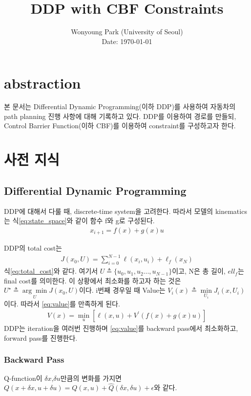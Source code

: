 \documentclass[journal]{IEEEtran}
\begin{document}
\title{DDP with CBF Constraints}

\author{Wonyoung Park (University of Seoul)\\ 
        Date: \today
        }

\maketitle

\section{abstraction}
본 문서는 Differential Dynamic Programming(이하 DDP)를 사용하여 자동차의 path planning 진행 사항에 대해 기록하고 있다. DDP를 이용하여 경로를 만들되, Control Barrier Function(이하 CBF)를 이용하여 constraint를 구성하고자 한다. 

\section{사전 지식}
\subsection{Differential Dynamic Programming}
DDP에 대해서 다룰 때, discrete-time system을 고려한다. 따라서 모델의 kinematics는 식\eqref{eq:state_space}와 같이 함수 f와 g로 구성된다.
\begin{align}
	x_{i+1}=f(x)+g(x)u
	\label{eq:state_space}
\end{align}

DDP의 total cost는
\begin{align}
	J(x_0,U)=\sum_{i=0}^{N-1} \ell(x_i,u_i)+\ell_f(x_N)
	\label{eq:total_cost}
\end{align}
식\eqref{eq:total_cost}와 같다. 여기서 $U \triangleq \{u_0,u_1,u_2...,u_{N-1}\}$이고, N은 총 길이, $ell_f$는 final cost를 의미한다.
이 상황에서 최소화를 하고자 하는 것은 $U^{\star}\triangleq\underset{U}{\arg\min} J(x_0,U)$이다.
i번째 경우일 때 Value는 $V_i(x)\triangleq \underset{U_i}{\min}J_i(x,U_i)$이다. 따라서 \eqref{eq:value}를 만족하게 된다.
\begin{align}
	 V(x)=\underset{u}{\min}[\ell(x,u)+V^{\prime}(f(x)+g(x)u)]
	\label{eq:value}
\end{align}
DDP는 iteration을 여러번 진행하며 \eqref{eq:value}를 backward pass에서 최소화하고, forward pass를 진행한다.

\subsubsection{Backward Pass}
Q-function이 $\delta x$,$\delta u$만큼의 변화를 가지면 $Q(x+\delta x,u+\delta u)=Q(x,u)+\hat{Q}(\delta x,\delta u)+\epsilon$와 같다.
\end{document}
